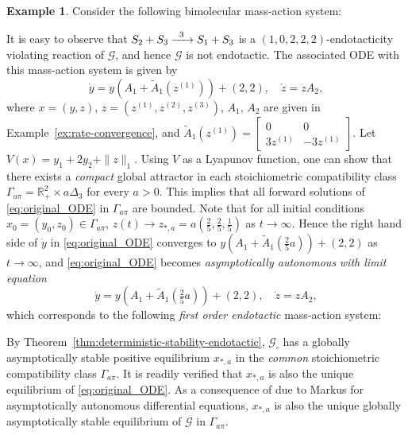\documentclass[10pt]{amsart}
\numberwithin{equation}{section}
\theoremstyle{plain}
\theoremstyle{definition}
\newtheorem{example}[theorem]{Example}
\theoremstyle{remark}
\newcommand{\cG}{\mathcal{G}}
\begin{document}
\begin{example}
\label{ex:nonlinear}
Consider the following bimolecular mass-action system:
\begin{center}
\end{center}

It is easy to observe that $S_2+S_3\ce{->[3]}S_1+S_3$ is a $(1,0,2,2,2)$-endotacticity violating reaction of $\mathcal{G}$, and hence   $\mathcal{G}$ is not endotactic. The associated ODE with this mass-action system is given by
\begin{equation}\label{eq:original_ODE}
    \dot{y}= y(A_1+\widetilde{A}_1(z^{(1)})) + (2,2),\quad \dot{z} = z A_2,
\end{equation}
where $x=(y,z)$, $z=(z^{(1)},z^{(2)},z^{(3)})$, $A_1$, $A_2$ are given in Example~\ref{ex:rate-convergence}, and  $\widetilde{A}_1(z^{(1)}) = \begin{bmatrix}
    0&0\\
3z^{(1)}&-3z^{(1)}
\end{bmatrix}$. Let $V(x)=y_1+2y_2+\|z\|_1$. Using $V$ as a Lyapunov function, one can show that there exists a \emph{compact} global attractor in each stoichiometric compatibility class $\Gamma_{a\pi}=\mathbb{R}^2_+\times a\Delta_3$ for every $a>0$. This implies that all forward  solutions of \eqref{eq:original_ODE} in $\Gamma_{a\pi}$ are bounded. Note that for all initial conditions $x_0=(y_0,z_0)\in \Gamma_{a\pi}$, $z(t)\to z_{*,a}=a(\tfrac{2}{5},\tfrac{2}{5},\tfrac{1}{5})$ as $t\to\infty$. Hence the right hand side of $\dot{y}$ in  \eqref{eq:original_ODE} converges to $y(A_1+\widetilde{A}_1(\tfrac{2}{5}a)) + (2,2)$ as $t\to\infty$, and \eqref{eq:original_ODE} becomes  \emph{asymptotically autonomous} \cite{T92} \emph{with limit equation} 
\begin{equation}
\label{eq:limit_ODE}
\dot{y} = y(A_1+\widetilde{A}_1(\tfrac{2}{5}a)) + (2,2),\quad  \dot{z} = z A_2,
\end{equation}
which corresponds to the following \emph{first order endotactic} mass-action system:
\begin{center}
\end{center}
By Theorem~\ref{thm:deterministic-stability-endotactic}, $\mathcal{G}_{\square}$ has a globally asymptotically stable positive equilibrium $x_{*,a}$ in the \emph{common}  stoichiometric compatibility class $\Gamma_{a\pi}$. It is readily verified that $x_{*,a}$ is also the unique equilibrium of \eqref{eq:original_ODE}. As a consequence of \cite[Theorem~1.2]{T92} due to Markus \cite{M56} for asymptotically autonomous differential equations, $x_{*,a}$ is also the unique globally asymptotically stable equilibrium of $\mathcal{G}$ in $\Gamma_{a\pi}$.  
\end{example}
\end{document}
